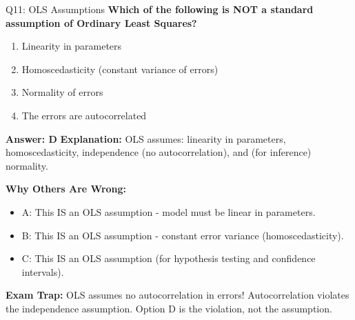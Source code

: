 \documentclass[8pt]{beamer}
\begin{document}
	\begin{frame}{Q11: OLS Assumptions}
		\fontsize{6.5}{7.5}\selectfont
		\textbf{Which of the following is NOT a standard assumption of Ordinary Least Squares?}
		
		\begin{enumerate}
			\item Linearity in parameters
			\item Homoscedasticity (constant variance of errors)
			\item Normality of errors
			\item The errors are autocorrelated
		\end{enumerate}
		
		\vspace{0.05cm}
		\textcolor{myblue}{\textbf{Answer: D}}
		\vspace{0.05cm}
		\textcolor{myblue}{\textbf{Explanation:}} OLS assumes: linearity in parameters, homoscedasticity, independence (no autocorrelation), and (for inference) normality.
		
		\vspace{0.05cm}
		\textcolor{myred}{\textbf{Why Others Are Wrong:}}
		\begin{itemize}
			\item \textcolor{myred}{A:} This IS an OLS assumption - model must be linear in parameters.
			\item \textcolor{myred}{B:} This IS an OLS assumption - constant error variance (homoscedasticity).
			\item \textcolor{myred}{C:} This IS an OLS assumption (for hypothesis testing and confidence intervals).
		\end{itemize}
		
		\textcolor{myred}{\textbf{Exam Trap:}} OLS assumes \textcolor{myblue}{no autocorrelation} in errors! Autocorrelation violates the independence assumption. Option D is the violation, not the assumption.
	\end{frame}
	
\end{document}
